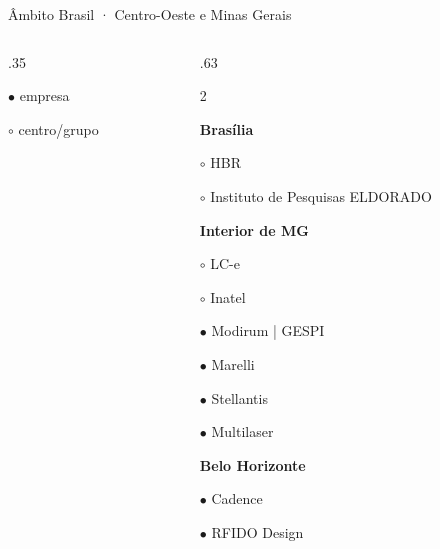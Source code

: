 \begin{frame}{Âmbito Brasil · Centro-Oeste e Minas Gerais}
\begin{columns}[T,onlytextwidth]
\begin{column}{.35\textwidth}
{\tiny $\bullet$ empresa\par $\circ$ centro/grupo}
\end{column}
\begin{column}{.63\textwidth}
\footnotesize\setlength{\columnsep}{3mm}\begin{multicols}{2}\raggedright
\textcolor{blue_theme}{\textbf{Brasília}}\par\smallskip
\noindent\parbox{\linewidth}{$\circ$ HBR}\par
\noindent\parbox{\linewidth}{$\circ$ Instituto de Pesquisas ELDORADO}\par
\medskip
\textcolor{blue_theme}{\textbf{Interior de MG}}\par\smallskip
\noindent\parbox{\linewidth}{$\circ$ LC-e}\par
\noindent\parbox{\linewidth}{$\circ$ Inatel}\par
\noindent\parbox{\linewidth}{$\bullet$ Modirum | GESPI}\par
\noindent\parbox{\linewidth}{$\bullet$ Marelli}\par
\noindent\parbox{\linewidth}{$\bullet$ Stellantis}\par
\noindent\parbox{\linewidth}{$\bullet$ Multilaser}\par
\medskip
\textcolor{blue_theme}{\textbf{Belo Horizonte}}\par\smallskip
\noindent\parbox{\linewidth}{$\bullet$ Cadence}\par
\noindent\parbox{\linewidth}{$\bullet$ RFIDO Design}\par
\medskip
\end{multicols}
\end{column}
\end{columns}
\creditoBrasil
\end{frame}
